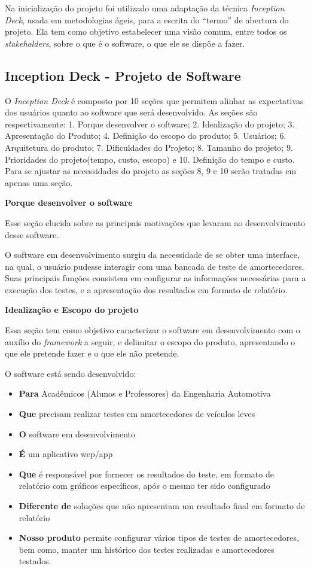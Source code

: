 	Na inicialização do projeto foi utilizado uma adaptação da técnica \textit{Inception Deck}, usada em metodologias ágeis, para a escrita do “termo” de abertura do projeto. Ela tem como objetivo estabelecer uma visão comum, entre todos os \textit{stakeholders}, sobre o que é o software, o que ele se dispõe a fazer. 

\subsection{Inception Deck - Projeto de Software}

	O \textit{Inception Deck} é composto por 10 seções que permitem alinhar as expectativas dos usuários quanto ao software que será desenvolvido. As seções são respectivamente: 1. Porque desenvolver o software; 2. Idealização do projeto; 3. Apresentação do Produto; 4. Definição do escopo do produto; 5. Usuários; 6. Arquitetura do produto; 7. Dificuldades do Projeto; 8. Tamanho do projeto; 9. Prioridades do projeto(tempo, custo, escopo) e 10. Definição do tempo e custo. Para se ajustar as necessidades do projeto as seções 8, 9 e 10 serão tratadas em apenas uma seção.


\textbf{Porque desenvolver o software}

	Esse seção elucida sobre as principais motivações que levaram ao desenvolvimento desse software.

	O software em desenvolvimento surgiu da necessidade de se obter uma  interface, na qual, o usuário pudesse interagir com uma bancada de teste de amortecedores. Suas principais funções consistem em configurar as informações necessárias para a execução dos testes, e a apresentação dos resultados em formato de relatório.


\textbf{Idealização e Escopo do projeto}

	Essa seção tem como objetivo caracterizar o software em desenvolvimento com o auxílio do \textit{framework} a seguir, e delimitar o escopo do produto, apresentando o que ele pretende fazer e o que ele não pretende.


	O software está sendo desenvolvido:
	\begin{itemize}
		\item \textbf{Para} Acadêmicos (Alunos e Professores) da Engenharia Automotiva
		\item \textbf{Que} precisam realizar testes em amortecedores de veículos leves
		\item \textbf{O} software em desenvolvimento
		\item \textbf{É} um aplicativo wep/app
		\item \textbf{Que} é responsável por fornecer os resultados do teste, em formato de relatório com gráficos específicos, após o mesmo ter sido configurado
		\item \textbf{Diferente de} soluções que não apresentam um resultado final em formato de relatório
		\item \textbf{Nosso produto} permite configurar vários tipos de testes de amortecedores, bem como, manter um histórico dos testes realizadas e amortecedores testados.
	\end{itemize}

